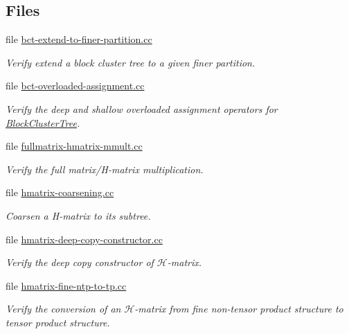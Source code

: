 \subsection*{Files}
\begin{DoxyCompactItemize}
\item 
file \hyperlink{bct-extend-to-finer-partition_8cc}{bct-\/extend-\/to-\/finer-\/partition.\+cc}
\begin{DoxyCompactList}\small\item\em Verify extend a block cluster tree to a given finer partition. \end{DoxyCompactList}\item 
file \hyperlink{bct-overloaded-assignment_8cc}{bct-\/overloaded-\/assignment.\+cc}
\begin{DoxyCompactList}\small\item\em Verify the deep and shallow overloaded assignment operators for {\ttfamily \hyperlink{classBlockClusterTree}{Block\+Cluster\+Tree}}. \end{DoxyCompactList}\item 
file \hyperlink{fullmatrix-hmatrix-mmult_8cc}{fullmatrix-\/hmatrix-\/mmult.\+cc}
\begin{DoxyCompactList}\small\item\em Verify the full matrix/\+H-\/matrix multiplication. \end{DoxyCompactList}\item 
file \hyperlink{hmatrix-coarsening_8cc}{hmatrix-\/coarsening.\+cc}
\begin{DoxyCompactList}\small\item\em Coarsen a H-\/matrix to its subtree. \end{DoxyCompactList}\item 
file \hyperlink{hmatrix-deep-copy-constructor_8cc}{hmatrix-\/deep-\/copy-\/constructor.\+cc}
\begin{DoxyCompactList}\small\item\em Verify the deep copy constructor of $\mathcal{H}$-\/matrix. \end{DoxyCompactList}\item 
file \hyperlink{hmatrix-fine-ntp-to-tp_8cc}{hmatrix-\/fine-\/ntp-\/to-\/tp.\+cc}
\begin{DoxyCompactList}\small\item\em Verify the conversion of an $\mathcal{H}$-\/matrix from fine non-\/tensor product structure to tensor product structure. \end{DoxyCompactList}\item 

\end{DoxyCompactItemize}
